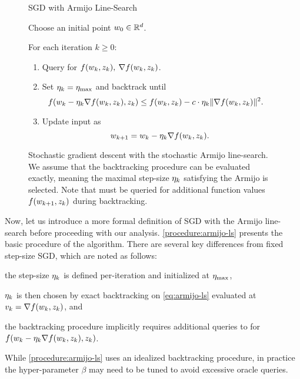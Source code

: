 \begin{figure}[t]
    \begin{procedure}{\ac{SGD} with Armijo Line-Search}
    \item Choose an initial point \( w_0 \in \mathbb{R}^d \).
    \item For each iteration \( k \geq 0 \):
        \begin{enumerate}
            \item Query \oracle{} for \( f(w_k, z_{k}), \: \nabla f(w_k, z_{k}) \). 
            \item Set \( \eta_k =  \eta_{\text{max}} \) and backtrack until 
                \[  \hspace{-1em} f(w_k - \eta_k \nabla f(w_k, z_{k}), z_{k}) \leq f(w_k, z_{k}) - c \cdot \eta_k \|\nabla f(w_k, z_{k})\|^2. \]
            \item Update input as\vspace{-1ex}%
                \[ w_{k+1} = w_k - \eta_k \nabla f(w_k, z_{k}). \]
        \end{enumerate}
    \end{procedure}
    \caption[Procedural definition of stochastic gradient descent with the stochastic Armijo line-search.]%
        {Stochastic gradient descent with the stochastic Armijo line-search.
        We assume that the backtracking procedure can be evaluated exactly, meaning the maximal step-size \( \eta_k \) satisfying the Armijo is selected.
        Note that \oracle{} must be queried for additional function values \( f(w_{k+1}, z_{k}) \) during backtracking.}%
    \label{procedure:armijo-ls}
\end{figure}

Now, let us introduce a more formal definition of \ac{SGD} with the Armijo line-search before proceeding with our analysis.
\autoref{procedure:armijo-ls} presents the basic procedure of the algorithm.
There are several key differences from fixed step-size \ac{SGD}, which are noted as follows:
\begin{inparaenum}[(i)]
    \item the step-size \( \eta_k \) is defined per-iteration and initialized at \( \eta_{\text{max}} \),
    \item \( \eta_k \) is then chosen by exact backtracking on \autoref{eq:armijo-ls} evaluated at \( v_k = \nabla f(w_k, z_{k}) \), and
    \item the backtracking procedure implicitly requires additional queries to \oracle{} for \( f(w_k - \eta_k \nabla f(w_k, z_{k}), z_{k}) \).
\end{inparaenum}
While \autoref{procedure:armijo-ls} uses an idealized backtracking procedure, in practice the hyper-parameter \( \beta \) may need to be tuned to avoid excessive oracle queries. 

